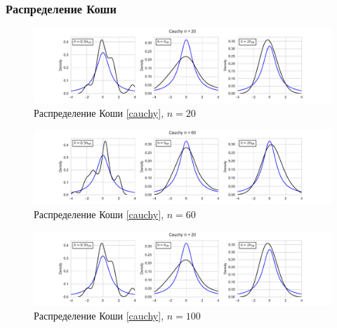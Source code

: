 \documentclass[a4paper]{article}
\begin{document}
\subsubsection{Распределение Коши}
\begin{figure}[H]
    \centering
    \includegraphics[width = 16 cm]{resources/cauchyKde20.pdf}
    \caption{Распределение Коши \eqref{cauchy}, $n = 20$}
    \label{fig:cauchyKDE20}
\end{figure}
\begin{figure}[H]
    \centering
    \includegraphics[width = 16 cm]{resources/cauchyKde60.pdf}
    \caption{Распределение Коши \eqref{cauchy}, $n = 60$}
    \label{fig:cauchyKDE60}
\end{figure}
\begin{figure}[H]
    \centering
    \includegraphics[width = 16 cm]{resources/cauchyKde20.pdf}
    \caption{Распределение Коши \eqref{cauchy}, $n = 100$}
    \label{fig:cauchyKDE100}
\end{figure}
\end{document}
